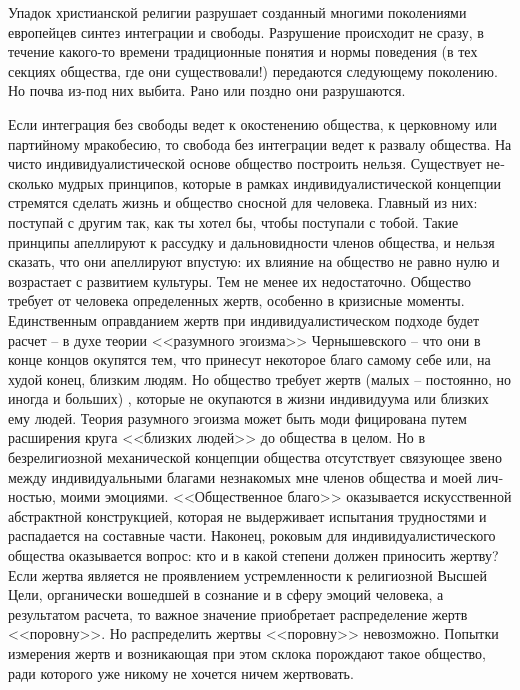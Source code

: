 \documentclass{book}
\begin{document}
Упадок христианской религии разрушает созданный многи­ми поколениями европейцев синтез 
интеграции и свободы. Раз­рушение происходит не сразу, в течение какого-то времени 
традиционные понятия и нормы поведения (в тех секциях об­щества, где они 
существовали!) передаются следующему поколению. Но почва из-под них выбита. Рано или 
поздно они разру­шаются.

Если интеграция без свободы ведет к окостенению общест­ва, к церковному или партийному 
мракобесию, то свобода без интеграции ведет к развалу общества. На чисто ин\-ди\-ви\-дуа\-лис\-ти\-чес\-кой основе общество построить нельзя. Существует не­сколько мудрых принципов, 
которые в рамках индивидуали­стической концепции стремятся сделать жизнь и общество 
снос­ной для человека. Главный из них: поступай с другим так, как ты хотел бы, чтобы 
поступали с тобой. Такие принципы апел­лируют к рассудку и дальновидности членов 
общества, и нель­зя сказать, что они апеллируют впустую: их влияние на общест­во не 
равно нулю и возрастает с развитием культуры. Тем не менее их недостаточно. Общество 
требует от человека опре­деленных жертв, особенно в кризисные моменты. Единственным 
оправданием жертв при индивидуалистическом подходе будет расчет -- в духе теории 
<<разумного эгоизма>> Чернышевского -- что они в конце концов окупятся тем, что 
принесут некоторое благо самому себе или, на худой конец, близким людям. Но об­щество 
требует жертв (малых -- постоянно, но иногда и боль­ших) , которые не окупаются в 
жизни индивидуума или близ­ких ему людей. Теория разумного эгоизма может быть моди­
фицирована путем расширения круга <<близких людей>> до об­щества в целом. Но в 
безрелигиозной механической концеп­ции общества отсутствует связующее звено между 
индивиду­альными благами незнакомых мне членов общества и моей лич­ностью, моими 
эмоциями. <<Общественное благо>> оказывается искусственной абстрактной конструкцией, 
которая не выдер­живает испытания трудностями и распадается на составные части. 
Наконец, роковым для индивидуалистического общест­ва оказывается вопрос: кто и в какой 
степени должен прино­сить жертву? Если жертва является не проявлением устремлен­ности к 
религиозной Высшей Цели, органически вошедшей в сознание и в сферу эмоций человека, а 
результатом расчета, то важное значение приобретает распределение жертв <<поров­ну>>. 
Но распределить жертвы <<поровну>> невозможно. Попыт­ки измерения жертв и возникающая 
при этом склока порож­дают такое общество, ради которого уже никому не хочется ничем жертвовать.
\end{document}
